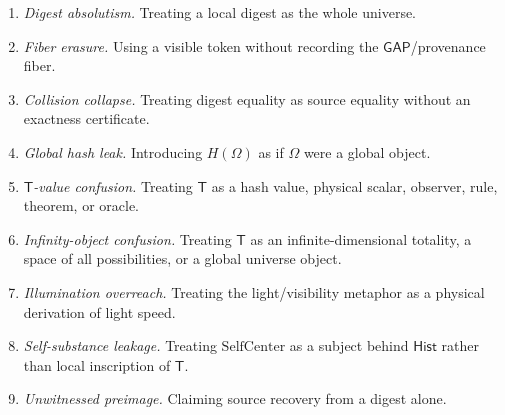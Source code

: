 \begin{enumerate}
\item \emph{Digest absolutism.} Treating a local digest as the whole universe.
\item \emph{Fiber erasure.} Using a visible token without recording the $\mathsf{GAP}$/provenance fiber.
\item \emph{Collision collapse.} Treating digest equality as source equality without an exactness certificate.
\item \emph{Global hash leak.} Introducing $H(\Omega)$ as if $\Omega$ were a global object.
\item \emph{$\mathsf{T}$-value confusion.} Treating $\mathsf{T}$ as a hash value, physical scalar, observer, rule, theorem, or oracle.
\item \emph{Infinity-object confusion.} Treating $\mathsf{T}$ as an infinite-dimensional totality, a space of all possibilities, or a global universe object.
\item \emph{Illumination overreach.} Treating the light/visibility metaphor as a physical derivation of light speed.
\item \emph{Self-substance leakage.} Treating $\mathrm{SelfCenter}$ as a subject behind $\mathsf{Hist}$ rather than local inscription of $\mathsf{T}$.
\item \emph{Unwitnessed preimage.} Claiming source recovery from a digest alone.
\end{enumerate}

